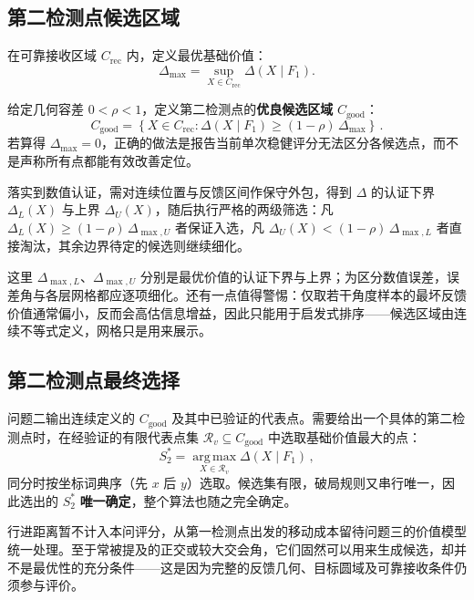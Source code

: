 \documentclass[withoutpreface]{cumcmthesis}
\begin{document}
\subsection{第二检测点候选区域}

在可靠接收区域 $C_{\mathrm{rec}}$ 内，定义最优基础价值：
\begin{equation}\label{eq:delta_max}
\Delta_{\max} = \sup_{X \in C_{\mathrm{rec}}} \Delta(X\mid F_1).
\end{equation}

给定几何容差 $0 < \rho < 1$，定义第二检测点的\textbf{优良候选区域} $C_{\mathrm{good}}$：
\begin{equation}\label{eq:C_good}
\boxed{
C_{\mathrm{good}} = \left\{ X \in C_{\mathrm{rec}} : \Delta(X\mid F_1) \ge (1 - \rho)\, \Delta_{\max} \right\}
}\,.
\end{equation}
若算得 $\Delta_{\max}=0$，正确的做法是报告当前单次稳健评分无法区分各候选点，而不是声称所有点都能有效改善定位。

落实到数值认证，需对连续位置与反馈区间作保守外包，得到 $\Delta$ 的认证下界 $\Delta_L(X)$ 与上界 $\Delta_U(X)$，随后执行严格的两级筛选：凡 $\Delta_L(X) \ge (1 - \rho)\, \Delta_{\max,U}$ 者保证入选，凡 $\Delta_U(X) < (1 - \rho)\, \Delta_{\max,L}$ 者直接淘汰，其余边界待定的候选则继续细化。

这里 $\Delta_{\max,L}$、$\Delta_{\max,U}$ 分别是最优价值的认证下界与上界；为区分数值误差，误差角与各层网格都应逐项细化。还有一点值得警惕：仅取若干角度样本的最坏反馈价值通常偏小，反而会高估信息增益，因此只能用于启发式排序——候选区域由连续不等式定义，网格只是用来展示。

\subsection{第二检测点最终选择}

问题二输出连续定义的 $C_{\mathrm{good}}$ 及其中已验证的代表点。需要给出一个具体的第二检测点时，在经验证的有限代表点集 $\mathcal R_v\subseteq C_{\mathrm{good}}$ 中选取基础价值最大的点：
\begin{equation}\label{eq:S2_star}
\boxed{
S_2^* = \operatorname*{arg\,max}_{X \in \mathcal R_v} \Delta(X\mid F_1)
}\,,
\end{equation}
同分时按坐标词典序（先 $x$ 后 $y$）选取。候选集有限，破局规则又串行唯一，因此选出的 $S_2^*$ \textbf{唯一确定}，整个算法也随之完全确定。

行进距离暂不计入本问评分，从第一检测点出发的移动成本留待问题三的价值模型统一处理。至于常被提及的正交或较大交会角，它们固然可以用来生成候选，却并不是最优性的充分条件——这是因为完整的反馈几何、目标圆域及可靠接收条件仍须参与评价。
\end{document}
